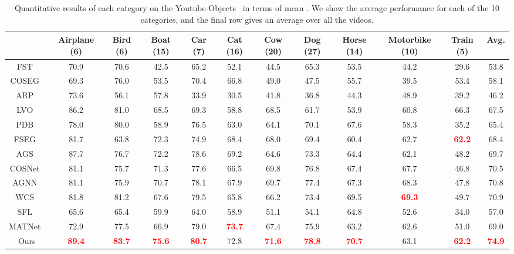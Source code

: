 \documentclass[sigconf]{acmart}
\newcommand{\textBC}[2]{\textbf{\textcolor{#1}{#2}}}
\begin{document}
\begin{table*}
\Large
	\centering
	\caption{
Quantitative results of each category on the Youtube-Objects~\cite{youtube-objects} in terms of mean . We show the average performance for each of the 10 categories, and the final row gives an average over all the videos.}
	\resizebox{0.9\textwidth}{!}
	{
		\setlength\tabcolsep{4pt}
		\renewcommand\arraystretch{1}
		\begin{tabular}{c||cccccccccc|c}
		 \toprule[1pt]
			& Airplane (6) & Bird (6) & Boat (15)  & Car (7) & Cat (16)& Cow (20) & Dog (27) &Horse (14)& Motorbike (10)& Train (5) & Avg. \\
\hline
			\hline
			FST~\cite{FST}& 70.9 &70.6& 42.5&65.2  &52.1&44.5&65.3 &53.5&44.2 &29.6 &53.8  \\		
			COSEG~\cite{COSEG}&69.3   &76.0 &53.5  &70.4 & 66.8& 49.0 & 47.5& 55.7& 39.5& 53.4& 58.1\\
ARP~\cite{ARP} &73.6 & 56.1&57.8 &33.9& 30.5& 41.8& 36.8 &44.3& 48.9& 39.2&46.2\\
			LVO~\cite{LVO} &86.2 &81.0&68.5 &69.3& 58.8&68.5&61.7 &53.9& 60.8& 66.3&67.5\\
PDB~\cite{PDB} &78.0  &80.0 &58.9 &76.5 &63.0&64.1&70.1 &67.6&58.3&35.2&65.4\\
			FSEG~\cite{FSEG}  &{81.7}  &63.8 &{72.3}&74.9&68.4&68.0 &69.4 & 60.4&62.7&\textBC{red}{62.2}&68.4\\


AGS~\cite{AGS} &{87.7}&76.7&72.2&78.6&69.2&64.6&73.3&64.4&62.1&48.2&69.7\\
COSNet~\cite{COSNet} &81.1&75.7&71.3&77.6&66.5&{69.8}&76.8&67.4&67.7&46.8&70.5\\
AGNN~\cite{AGNN} &81.1  &75.9 &70.7 &78.1 &67.9&69.7&{77.4} &67.3&68.3&47.8&70.8\\
WCS~\cite{WCS} &81.8  &81.2 &67.6 &79.5 &65.8&66.2&73.4 &{69.5}&\textBC{red}{69.3}&49.7&70.9\\
\hline\hline
SFL~\cite{SFL}&65.6  &65.4 &59.9&64.0 &58.9&51.1& 54.1 &64.8& 52.6& 34.0&57.0\\
MATNet~\cite{MATNet} &72.9  &77.5 &66.9 &79.0 &\textBC{red}{73.7}&67.4&75.9 &63.2&62.6&51.0&69.0\\
Ours &\textBC{red}{89.4}  &\textBC{red}{83.7} &\textBC{red}{75.6} &\textBC{red}{80.7} &72.8 &\textBC{red}{71.6} &\textBC{red}{78.8}&\textBC{red}{70.7}&{63.1}&\textBC{red}{62.2}&\textBC{red}{74.9}\\ \bottomrule[1pt]
\end{tabular}
}
\label{table:Table2}
\end{table*}
\end{document}
